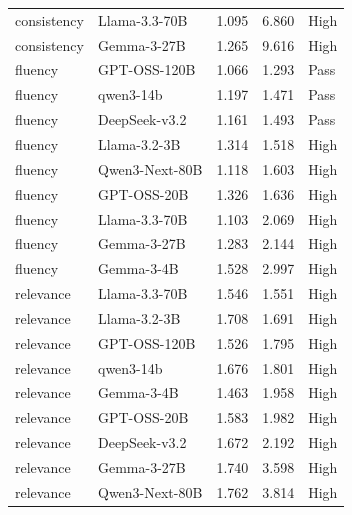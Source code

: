 \begin{table}[t]
{\begin{tabular}{llrrl}
consistency & Llama-3.3-70B & 1.095 & 6.860 & High \\
consistency & Gemma-3-27B & 1.265 & 9.616 & High \\
fluency & GPT-OSS-120B & 1.066 & 1.293 & Pass \\
fluency & qwen3-14b & 1.197 & 1.471 & Pass \\
fluency & DeepSeek-v3.2 & 1.161 & 1.493 & Pass \\
fluency & Llama-3.2-3B & 1.314 & 1.518 & High \\
fluency & Qwen3-Next-80B & 1.118 & 1.603 & High \\
fluency & GPT-OSS-20B & 1.326 & 1.636 & High \\
fluency & Llama-3.3-70B & 1.103 & 2.069 & High \\
fluency & Gemma-3-27B & 1.283 & 2.144 & High \\
fluency & Gemma-3-4B & 1.528 & 2.997 & High \\
relevance & Llama-3.3-70B & 1.546 & 1.551 & High \\
relevance & Llama-3.2-3B & 1.708 & 1.691 & High \\
relevance & GPT-OSS-120B & 1.526 & 1.795 & High \\
relevance & qwen3-14b & 1.676 & 1.801 & High \\
relevance & Gemma-3-4B & 1.463 & 1.958 & High \\
relevance & GPT-OSS-20B & 1.583 & 1.982 & High \\
relevance & DeepSeek-v3.2 & 1.672 & 2.192 & High \\
relevance & Gemma-3-27B & 1.740 & 3.598 & High \\
relevance & Qwen3-Next-80B & 1.762 & 3.814 & High \\
\bottomrule
\end{tabular}
}
\end{table}